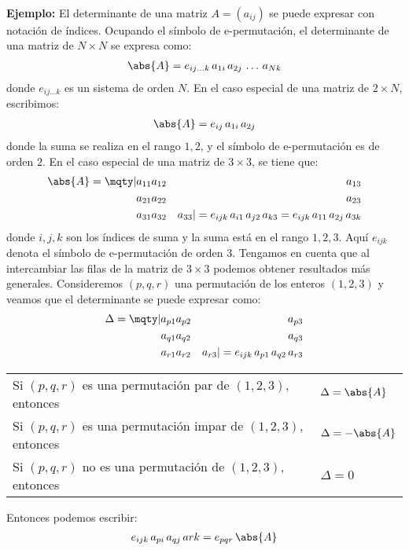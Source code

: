 \\[0.5em]
\noindent
\textbf{Ejemplo: } El determinante de una matriz $A = (a_{ij})$ se puede expresar con notación de índices. Ocupando el símbolo de e-permutación, el determinante de una matriz de $N \times N$ se expresa como:
\begin{align*}
\abs{A} = e_{ij \ldots k} \, a_{1i} \, a_{2j} \, \ldots \, a_{Nk} 
\end{align*}
donde $e_{ij \ldots k}$ es un sistema de orden $N$. En el caso especial de una matriz de $2 \times N$, escribimos:
\begin{align*}
\abs{A} = e_{ij} \, a_{1i} \, a_{2j}
\end{align*}
donde la suma se realiza en el rango $1, 2$, y el símbolo de e-permutación es de orden $2$. En el caso especial de una matriz de $3 \times 3$, se tiene que:
\begin{align*}
\abs{A} = \mqty|
a_{11} & a_{12} & a_{13} \\
a_{21} & a_{22} & a_{23} \\
a_{31} & a_{32} & a_{33}
| = e_{ijk} \, a_{i1} \, a_{j2} \, a_{k3} = e_{ijk} \, a_{11} \, a_{2j} \, a_{3k}
\end{align*}
donde $i, j, k$ son los índices de suma y la suma está en el rango $1, 2, 3$. Aquí $e_{ijk}$ denota el símbolo de e-permutación de orden $3$. Tengamos en cuenta que al intercambiar las filas de la matriz de $3 \times 3$ podemos obtener resultados más generales. Consideremos $(p,q, r)$ una permutación de los enteros $(1, 2, 3)$ y veamos que el determinante se puede expresar como:
\begin{align*}
\Delta = \mqty|
a_{p1} & a_{p2} & a_{p3} \\
a_{q1} & a_{q2} & a_{q3} \\
a_{r1} & a_{r2} & a_{r3}
| = e_{ijk} \, a_{p1} \, a_{q2} \, a_{r3}
\end{align*}
\begin{table}[H]
\large
\centering
\begin{tabular}{l l}
Si $(p, q, r)$ es una permutación par de $(1, 2, 3)$, entonces & $\Delta = \abs{A}$ \\
Si $(p, q, r)$ es una permutación impar de $(1, 2, 3)$, entonces & $\Delta = -\abs{A}$ \\
Si $(p, q, r)$ no es una permutación de $(1, 2, 3)$, entonces & $\Delta = 0$    
\end{tabular}
\end{table}
Entonces podemos escribir:
\begin{align*}
e_{ijk} \, a_{pi} \, a_{qj} \, a{rk} = e_{pqr} \, \abs{A}
\end{align*}

